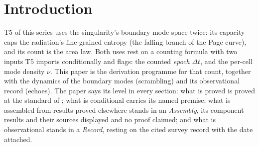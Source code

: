 \documentclass[11pt]{article}
\theoremstyle{definition}
\begin{document}
\newpage
\section{Introduction}\label{sec:intro}

T5 of this series \cite{ButlerT5} uses the singularity's boundary mode space twice: its capacity caps the radiation's fine-grained entropy (the falling branch of the Page curve), and its count is the area law. Both uses rest on a counting formula with two inputs T5 imports conditionally and flags: the counted \emph{epoch} $\Delta t$, and the per-cell mode density $\nu$. This paper is the derivation programme for that count, together with the dynamics of the boundary modes (scrambling) and its observational record (echoes). The paper says its level in every section: what is proved is proved at the standard of \cite{ButlerT1}; what is conditional carries its named premise; what is assembled from results proved elsewhere stands in an \emph{Assembly}, its component results and their sources displayed and no proof claimed; and what is observational stands in a \emph{Record}, resting on the cited survey record with the date attached.
\end{document}
